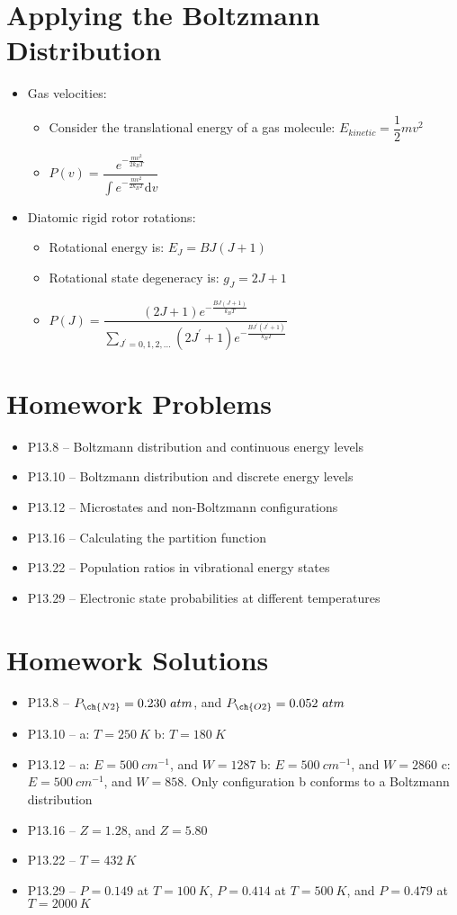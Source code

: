 \documentclass[12pt, openany, letterpaper]{memoir}
\begin{document}
\section*{Applying the Boltzmann Distribution}
\begin{itemize}
	\item Gas velocities:
	\begin{itemize}
		\item Consider the translational energy of a gas molecule: $E_{kinetic} = \dfrac{1}{2}mv^2$
		\item $P(v) = \dfrac{e^{-\frac{mv^2}{2k_BT}}}{\int\! e^{-\frac{mv^2}{2k_BT}} \mathrm{d}v}$
	\end{itemize}
	\item Diatomic rigid rotor rotations:
	\begin{itemize}
		\item Rotational energy is: $E_J=BJ(J+1)$
		\item Rotational state degeneracy is: $g_J = 2J+1$
		\item $P(J) = \dfrac{(2J+1)e^{-\frac{BJ(J+1)}{k_BT}}}{\sum\limits_{J^\prime=0,1,2,\ldots} (2J^\prime+1)e^{-\frac{BJ^\prime(J^\prime+1)}{k_BT}}}$
	\end{itemize} 
\end{itemize}
\section*{Homework Problems}
\begin{itemize}
	\item P13.8 -- Boltzmann distribution and continuous energy levels
	\item P13.10 -- Boltzmann distribution and discrete energy levels
	\item P13.12 -- Microstates and non-Boltzmann configurations
	\item P13.16 -- Calculating the partition function
	\item P13.22 -- Population ratios in vibrational energy states
	\item P13.29 -- Electronic state probabilities at different temperatures	
\end{itemize}
\section*{Homework Solutions}
\begin{itemize}
	\item P13.8 -- $P_{\ch{N2}}=0.230~atm$, and $P_{\ch{O2}}=0.052~atm$
	\item P13.10 -- a: $T=250~K$ b: $T=180~K$
	\item P13.12 -- a: $E=500~cm^{-1}$, and $W=1287$ b: $E=500~cm^{-1}$, and $W=2860$ c: $E=500~cm^{-1}$, and $W=858$. Only configuration b conforms to a Boltzmann distribution   
	\item P13.16 -- $Z=1.28$, and $Z=5.80$
	\item P13.22 -- $T=432~K$
	\item P13.29 -- $P=0.149$ at $T=100~K$, $P=0.414$ at $T=500~K$, and $P=0.479$ at $T=2000~K$
\end{itemize}
\end{document}
